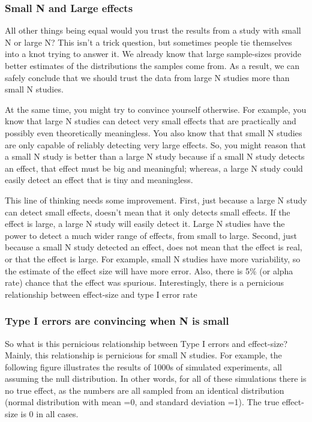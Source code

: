 \documentclass[
  letterpaper,
  DIV=11,
  numbers=noendperiod]{scrartcl}
\begin{document}
\hypertarget{small-n-and-large-effects}{%
\subsubsection{Small N and Large
effects}\label{small-n-and-large-effects}}

All other things being equal would you trust the results from a study
with small N or large N? This isn't a trick question, but sometimes
people tie themselves into a knot trying to answer it. We already know
that large sample-sizes provide better estimates of the distributions
the samples come from. As a result, we can safely conclude that we
should trust the data from large N studies more than small N studies.

At the same time, you might try to convince yourself otherwise. For
example, you know that large N studies can detect very small effects
that are practically and possibly even theoretically meaningless. You
also know that that small N studies are only capable of reliably
detecting very large effects. So, you might reason that a small N study
is better than a large N study because if a small N study detects an
effect, that effect must be big and meaningful; whereas, a large N study
could easily detect an effect that is tiny and meaningless.

This line of thinking needs some improvement. First, just because a
large N study can detect small effects, doesn't mean that it only
detects small effects. If the effect is large, a large N study will
easily detect it. Large N studies have the power to detect a much wider
range of effects, from small to large. Second, just because a small N
study detected an effect, does not mean that the effect is real, or that
the effect is large. For example, small N studies have more variability,
so the estimate of the effect size will have more error. Also, there is
5\% (or alpha rate) chance that the effect was spurious. Interestingly,
there is a pernicious relationship between effect-size and type I error
rate

\hypertarget{type-i-errors-are-convincing-when-n-is-small}{%
\subsubsection{Type I errors are convincing when N is
small}\label{type-i-errors-are-convincing-when-n-is-small}}

So what is this pernicious relationship between Type I errors and
effect-size? Mainly, this relationship is pernicious for small N
studies. For example, the following figure illustrates the results of
1000s of simulated experiments, all assuming the null distribution. In
other words, for all of these simulations there is no true effect, as
the numbers are all sampled from an identical distribution (normal
distribution with mean =0, and standard deviation =1). The true
effect-size is 0 in all cases.
\end{document}
